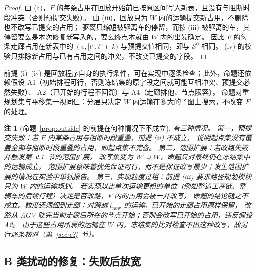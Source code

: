 \documentclass[manuscript,screen,review]{acmart}
\newtheorem{remark}{注}
\begin{document}
\begin{proof}
由 (ii)，\(F\) 的每条占用在回放开始前已按原区间写入新表，且没有与阻断时段冲突（否则预提交失败）。
由 (iii)，回放只为 \(W\) 内的运输提交新占用，不删除也不改写已提交的占用；
驱离只缩短被驱离车的停留，而按 (iii) 被驱离的车，其停留要么是本次修复新写入的，要么终点本就由 \(W\) 内的出发确定。
因此 \(F\) 的每条走廊占用在新表中的 \((e,[t^s,t^e),k)\) 与预提交值相同，即与 \(\mathcal{S}^0\) 相同。
(iv) 的校验只排除新占用与已有占用之间的冲突，不改变已提交的字段。
\end{proof}

前提 (i)--(iv) 是回放程序自身的执行条件，可在实现中逐条检查；此外，命题还依赖假设
A1（初始排程可行，否则冻结集的原字段之间就可能互相冲突、预提交必然失败）、
A2（已开始的行程不回溯）与 A4（走廊排他、节点限容）。
命题对重规划集与平移集一视同仁：分层只决定 \(W\) 内运输在多大的子图上搜索，不改变 \(F\) 的处理。

\begin{remark}[命题~\ref{prop:outside} 的前提在何种情况下不成立]
\label{rem:precommit}
有三种情况。
第一，预提交失败：若 \(F\) 内某条占用与阻断时段重叠，前提 (ii) 不成立，
说明起点集没有覆盖全部与阻断时段重叠的占用，即起点集不完备。
第二，范围扩展：若改路失败并触发第~\ref{sec:scope_escalation}~节的范围扩展，
改写集变为 \(W'\supsetneq W\)，命题只对最终仍在冻结集中的运输成立。
范围扩展意味着优先保证可行，而不是保证改写最少；发生范围扩展的情况在实验中单独报告。
第三，实现粒度过粗：前提 (iii) 要求路径规划模块\emph{只}为 \(W\) 内的运输规划。
若实现以比单次运输更粗的单位（例如整道工序链、整辆车的后续行程）决定是否改路，\(F\) 内的占用会被一并改写，
命题的结论随之不成立。粒度还须细到走廊：对跨越 \(t_{\mathrm{now}}\) 的运输，已开始的走廊占用原样保留，
改路从 AGV 驶完当前走廊后所在的节点开始；否则会改写已开始的占用，违反假设 A2。
由于这些占用所属的运输在 \(W\) 内，冻结集的比对检查不出这种改写，故另行逐条核对（第~\ref{sec:e2}~节）。
\end{remark}

\subsection{B 类扰动的修复：失败后放宽}
\label{sec:scope_escalation}
\end{document}

